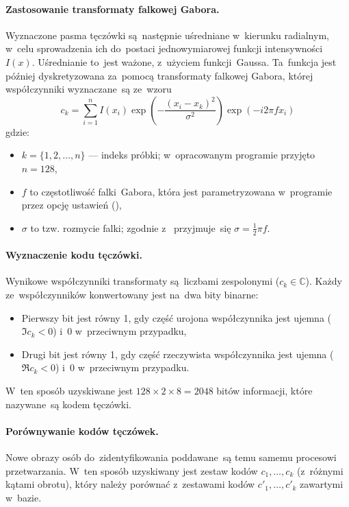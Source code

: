 \documentclass[11pt,a4paper]{article}
\begin{document}
\paragraph{Zastosowanie transformaty falkowej Gabora.}
Wyznaczone pasma tęczówki są~następnie uśredniane w~kierunku radialnym, w~celu sprowadzenia ich do~postaci jednowymiarowej funkcji intensywności $I(x)$.
Uśrednianie to~jest ważone, z~użyciem funkcji~Gaussa.
Ta~funkcja jest później dyskretyzowana za~pomocą transformaty falkowej Gabora, której współczynniki wyznaczane~są ze~wzoru
$$ c_k = \sum_{i=1}^n I(x_i) \exp \left( -\frac{(x_i - x_k)^2}{\sigma^2} \right) \exp (-i 2 \pi f x_i) $$
gdzie:
\begin{itemize}
    \item $k = \{1, 2, \dots, n\}$ --- indeks próbki; w~opracowanym programie przyjęto $n = 128$,
    \item $f$ to częstotliwość falki~Gabora, która jest parametryzowana w~programie przez opcję ustawień (),
    \item $\sigma$ to tzw. rozmycie falki; zgodnie z~\cite{slot2008} przyjmuje~się $\sigma = \frac{1}{2} \pi f$.
\end{itemize}

\paragraph{Wyznaczenie kodu tęczówki.}
Wynikowe współczynniki transformaty są~liczbami zespolonymi ($c_k \in \mathbb{C}$).
Każdy ze~współczynników konwertowany jest na~dwa bity binarne:
\begin{itemize}
    \item Pierwszy bit jest równy 1, gdy część urojona współczynnika jest ujemna ($\Im c_k < 0$) i~0 w~przeciwnym przypadku,
    \item Drugi bit jest równy 1, gdy część rzeczywista współczynnika jest ujemna ($\Re c_k < 0$) i~0 w~przeciwnym przypadku.
\end{itemize}
W~ten sposób uzyskiwane jest $128 \times 2 \times 8 = 2048$ bitów informacji, które nazywane~są kodem tęczówki.

\paragraph{Porównywanie kodów tęczówek.}
Nowe obrazy osób do~zidentyfikowania poddawane~są temu samemu procesowi przetwarzania.
W~ten sposób uzyskiwany jest zestaw kodów $c_1, \dots, c_k$ (z~różnymi kątami obrotu), który należy porównać z~zestawami kodów $c'_1, \dots, c'_k$ zawartymi w~bazie.
\end{document}
